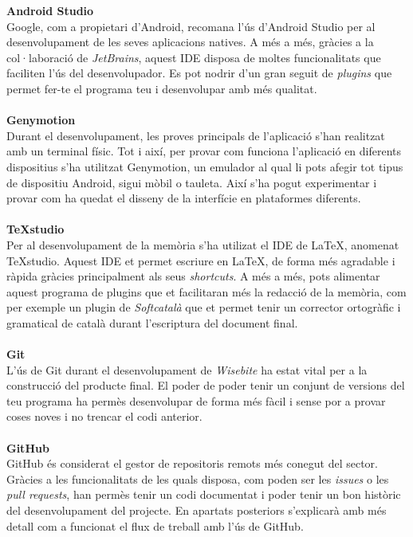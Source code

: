 \textbf{\large Android Studio}\cite{androidstudio}\\
Google, com a propietari d'Android, recomana l'ús d'Android Studio per al desenvolupament de les seves aplicacions natives. A més a més, gràcies a la col·laboració de \textit{JetBrains}, aquest IDE disposa de moltes funcionalitats que faciliten l'ús del desenvolupador. Es pot nodrir d'un gran seguit de \textit{plugins} que permet fer-te el programa teu i desenvolupar amb més qualitat.
\\\\
\textbf{\large Genymotion}\cite{genymotion}\\
Durant el desenvolupament, les proves principals de l'aplicació s'han realitzat amb un terminal físic. Tot i així, per provar com funciona l'aplicació en diferents dispositius s'ha utilitzat Genymotion, un emulador al qual li pots afegir tot tipus de dispositiu Android, sigui mòbil o tauleta. Així s'ha pogut experimentar i provar com ha quedat el disseny de la interfície en plataformes diferents.
\\\\
\textbf{\large TeXstudio}\cite{texstudio}\\
Per al desenvolupament de la memòria s'ha utilizat el IDE de \LaTeX, anomenat TeXstudio. Aquest IDE et permet escriure en \LaTeX, de forma més agradable i ràpida gràcies principalment als seus \textit{shortcuts}. A més a més, pots alimentar aquest programa de plugins que et facilitaran més la redacció de la memòria, com per exemple un plugin de \textit{Softcatalà} que et permet tenir un corrector ortogràfic i gramatical de català durant l'escriptura del document final.
\\\\
\textbf{\large Git}\cite{git}\\
L'ús de Git durant el desenvolupament de \textit{Wisebite} ha estat vital per a la construcció del producte final. El poder de poder tenir un conjunt de versions del teu programa ha permès desenvolupar de forma més fàcil i sense por a provar coses noves i no trencar el codi anterior.
\\\\
\textbf{\large GitHub}\cite{github}\\
GitHub és considerat el gestor de repositoris remots més conegut del sector. Gràcies a les funcionalitats de les quals disposa, com poden ser les \textit{issues} o les \textit{pull requests}, han permès tenir un codi documentat i poder tenir un bon històric del desenvolupament del projecte. En apartats posteriors s'explicarà amb més detall com a funcionat el flux de treball amb l'ús de GitHub.
